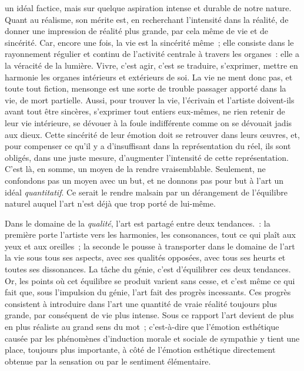 \documentclass[french,twoside]{book} %
\begin{document}
un idéal factice, mais sur quelque aspiration intense et durable de notre nature. Quant au réalisme, son mérite est, en recherchant l’intensité dans la réalité, de donner une impression de réalité plus grande, par cela même de vie et de sincérité. Car, encore une fois, la vie est la sincérité même ; elle consiste dans le rayonnement régulier et continu de l’activité centrale à travers les organes : elle a la véracité de la lumière. Vivre, c’est agir, c’est se traduire, s’exprimer, mettre en harmonie les organes intérieurs et extérieurs de soi. La vie ne ment donc pas, et toute tout fiction, mensonge est une sorte de trouble passager apporté dans la vie, de mort partielle. Aussi, pour trouver la vie, l’écrivain et l’artiste doivent-ils avant tout être sincères, s’exprimer tout entiers eux-mêmes, ne rien retenir de leur vie intérieure, se dévouer à la foule indifférente comme on se dévouait jadis aux dieux. Cette sincérité de leur émotion doit se retrouver dans leurs œuvres, et, pour compenser ce qu’il y a d’insuffisant dans la représentation du réel, ils sont obligés, dans une juste mesure, d’augmenter l’intensité de cette représentation. C’est là, en somme, un moyen de la rendre vraisemblable. Seulement, ne confondons pas un moyen avec un but, et ne donnons pas pour but à l’art un idéal \emph{quantitatif}. Ce serait le rendre malsain par un dérangement de l’équilibre naturel auquel l’art n’est déjà que trop porté de lui-même.\par
Dans le domaine de la \emph{qualité}, l’art est partagé entre deux tendances. : la première porte l’artiste vers les harmonies, les consonances, tout ce qui plaît aux yeux et aux oreilles ; la seconde le pousse à transporter dans le domaine de l’art la vie sous tous ses aspects, avec ses qualités opposées, avec tous ses heurts et toutes ses dissonances. La tâche du génie, c’est d’équilibrer ces deux tendances. Or, les points où cet équilibre se produit varient sans cesse, et c’est même ce qui fait que, sous l’impulsion du génie, l’art fait des progrès incessants. Ces progrès consistent à introduire dans l’art une quantité de vraie réalité toujours plus grande, par conséquent de vie plus intense. Sous ce rapport l’art devient de plus en plus réaliste au grand sens du mot ; c’est-à-dire que l’émotion esthétique causée par les phénomènes d’induction morale et sociale de sympathie y tient une place, toujours plus importante, à côté de l’émotion esthétique directement obtenue par la sensation ou par le sentiment élémentaire.\par
\end{document}
